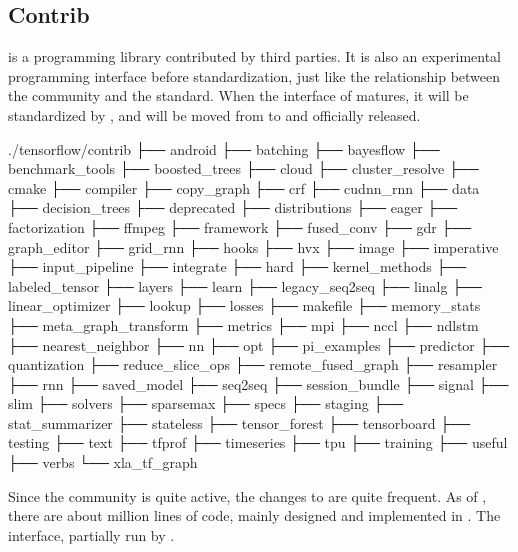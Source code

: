\begin{content}
\subsection{Contrib}
 is a programming library contributed by third parties. It is also an experimental programming interface before \tf{} standardization, just like the relationship between the  community and the  standard. When the interface of  matures, it will be standardized by \tf{}, and will be moved from  to  and officially released.

\begin{leftbar}
\begin{python}[caption={Contrib source structure}]
./tensorflow/contrib
├── android
├── batching
├── bayesflow
├── benchmark_tools
├── boosted_trees
├── cloud
├── cluster_resolve
├── cmake
├── compiler
├── copy_graph
├── crf
├── cudnn_rnn
├── data
├── decision_trees
├── deprecated
├── distributions
├── eager
├── factorization
├── ffmpeg
├── framework
├── fused_conv
├── gdr
├── graph_editor
├── grid_rnn
├── hooks
├── hvx
├── image
├── imperative
├── input_pipeline
├── integrate
├── hard
├── kernel_methods
├── labeled_tensor
├── layers
├── learn
├── legacy_seq2seq
├── linalg
├── linear_optimizer
├── lookup
├── losses
├── makefile
├── memory_stats
├── meta_graph_transform
├── metrics
├── mpi
├── nccl
├── ndlstm
├── nearest_neighbor
├── nn
├── opt
├── pi_examples
├── predictor
├── quantization
├── reduce_slice_ops
├── remote_fused_graph
├── resampler
├── rnn
├── saved_model
├── seq2seq
├── session_bundle
├── signal
├── slim
├── solvers
├── sparsemax
├── specs
├── staging
├── stat_summarizer
├── stateless
├── tensor_forest
├── tensorboard
├── testing
├── text
├── tfprof
├── timeseries
├── tpu
├── training
├── useful
├── verbs
└── xla_tf_graph
\end{python}
\end{leftbar}

Since the \tf{} community is quite active, the changes to  are quite frequent. As of , there are about  million lines of code, mainly designed and implemented in . The interface, partially run by .


\end{content}
